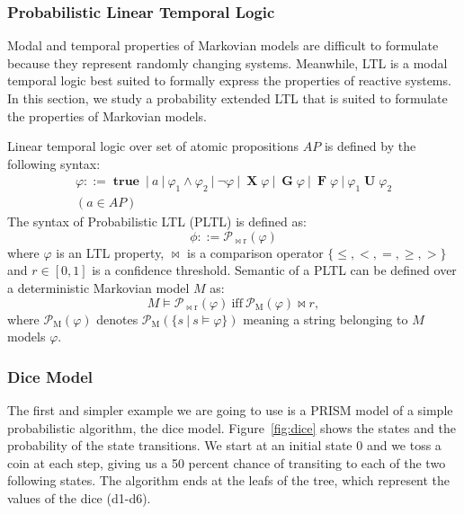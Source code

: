 \documentclass[
a4paper,
12pt
]{scrartcl}
\newcommand\true {\operatorname {\mathbf{true}}}
\newcommand\X{ \operatorname {\mathbf{X}}}
\newcommand\G{ \operatorname {\mathbf{G}}}
\newcommand\F{ \operatorname {\mathbf{F}}}
\newcommand\U{ \operatorname {\mathbf{U}}}
\newcommand\Prob[1]{ \operatorname {\mathcal{P}_{#1}}}
\begin{document}
\subsubsection{Probabilistic Linear Temporal Logic}
Modal and temporal properties of Markovian models are difficult to formulate because they represent randomly changing systems. Meanwhile, LTL is a modal temporal logic best suited to formally express the properties of reactive systems. In this section, we study a probability extended LTL that is suited to formulate the properties of Markovian models.
\par Linear temporal logic over set of atomic propositions $AP$ is defined by the following syntax:
\begin{multline*}
  \varphi ::= \true~|~a~|~\varphi_1 \land \varphi_2~|~\neg \varphi~|~\X \varphi~|~\G \varphi~|~\F \varphi~|~\varphi_1 \U \varphi_2 \\
  (a \in AP)
\end{multline*}
The syntax of Probabilistic LTL (PLTL) is defined as:
\begin{equation*}
  \phi ::= \Prob{\bowtie r} (\varphi)
\end{equation*}
where $\varphi$ is an LTL property, $\bowtie$ is a comparison operator $\{\leq, <, =, \geq, >\}$ and $r \in [0,1]$ is a confidence threshold.
Semantic of a PLTL can be defined over a deterministic Markovian model $M$ as:
\begin{equation*}
  M \models \Prob{\bowtie r}(\varphi)~\text{iff}~ \Prob{M}(\varphi) \bowtie r,
\end{equation*}
where $\Prob{M}(\varphi)$ denotes $\Prob{M}(\{s~|~s \models \varphi \})$ meaning a string belonging to $M$ models $\varphi$.
\subsubsection{Dice Model} \label{section:diceprograms}
The first and simpler example we are going to use is a PRISM model of a simple probabilistic algorithm, the dice model\cite{KY76}. Figure~\ref{fig:dice} shows the states and the probability of the state transitions. We start at an initial state 0 and we toss a coin at each step, giving us a 50 percent chance of transiting to each of the two following states. The algorithm ends at the leafs of the tree, which represent the values of the dice (d1-d6).
\end{document}
